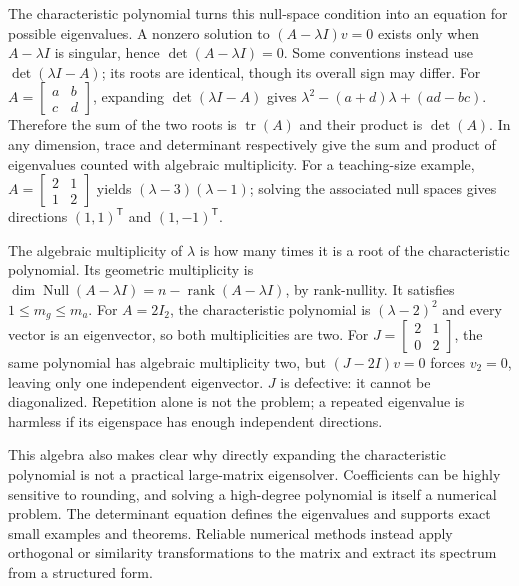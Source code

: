 The characteristic polynomial turns this null-space condition into an equation for possible eigenvalues. A nonzero solution to \((A-\lambda I)v=0\) exists only when \(A-\lambda I\) is singular, hence \(\det(A-\lambda I)=0\). Some conventions instead use \(\det(\lambda I-A)\); its roots are identical, though its overall sign may differ. For \(A=\begin{bmatrix}a&b\\c&d\end{bmatrix}\), expanding \(\det(\lambda I-A)\) gives \(\lambda^2-(a+d)\lambda+(ad-bc)\). Therefore the sum of the two roots is \(\operatorname{tr}(A)\) and their product is \(\det(A)\). In any dimension, trace and determinant respectively give the sum and product of eigenvalues counted with algebraic multiplicity. For a teaching-size example, \(A=\begin{bmatrix}2&1\\1&2\end{bmatrix}\) yields \((\lambda-3)(\lambda-1)\); solving the associated null spaces gives directions \((1,1)^\mathsf T\) and \((1,-1)^\mathsf T\).

The algebraic multiplicity of \(\lambda\) is how many times it is a root of the characteristic polynomial. Its geometric multiplicity is \(\dim\operatorname{Null}(A-\lambda I)=n-\operatorname{rank}(A-\lambda I)\), by rank-nullity. It satisfies \(1\le m_g\le m_a\). For \(A=2I_2\), the characteristic polynomial is \((\lambda-2)^2\) and every vector is an eigenvector, so both multiplicities are two. For \(J=\begin{bmatrix}2&1\\0&2\end{bmatrix}\), the same polynomial has algebraic multiplicity two, but \((J-2I)v=0\) forces \(v_2=0\), leaving only one independent eigenvector. \(J\) is defective: it cannot be diagonalized. Repetition alone is not the problem; a repeated eigenvalue is harmless if its eigenspace has enough independent directions.

This algebra also makes clear why directly expanding the characteristic polynomial is not a practical large-matrix eigensolver. Coefficients can be highly sensitive to rounding, and solving a high-degree polynomial is itself a numerical problem. The determinant equation defines the eigenvalues and supports exact small examples and theorems. Reliable numerical methods instead apply orthogonal or similarity transformations to the matrix and extract its spectrum from a structured form.

